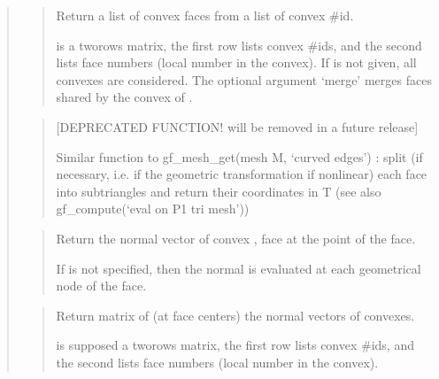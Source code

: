 \documentclass[a4paper,11pt,english]{sphinxmanual}
\begin{document}
\begin{quote}
\begin{quote}
\sphinxAtStartPar
Return a list of convex faces from a list of convex \#id.

\sphinxAtStartPar
{} is a two\sphinxhyphen{}rows matrix, the first row lists convex \#ids,
and the second lists face numbers (local number in the convex).
If  is not given, all convexes are considered. The optional
argument ‘merge’ merges faces shared by the convex of .
\end{quote}

\sphinxAtStartPar
{}
\begin{quote}

\sphinxAtStartPar
{[}DEPRECATED FUNCTION! will be removed in a future release{]}

\sphinxAtStartPar
Similar function to gf\_mesh\_get(mesh M, ‘curved edges’) : split (if
necessary, i.e. if the geometric transformation if non\sphinxhyphen{}linear)
each face into sub\sphinxhyphen{}triangles and return their coordinates in T
(see also gf\_compute(‘eval on P1 tri mesh’))
\end{quote}

\sphinxAtStartPar
{}
\begin{quote}

\sphinxAtStartPar
Return the normal vector of convex , face  at the  point of the face.

\sphinxAtStartPar
If  is not specified, then the normal is evaluated at each
geometrical node of the face.
\end{quote}

\sphinxAtStartPar
{}
\begin{quote}

\sphinxAtStartPar
Return matrix of (at face centers) the normal vectors of convexes.

\sphinxAtStartPar
{} is supposed a two\sphinxhyphen{}rows matrix, the first row lists convex
\#ids, and the second lists face numbers (local number in the convex).
\end{quote}


\end{quote}
\end{document}
